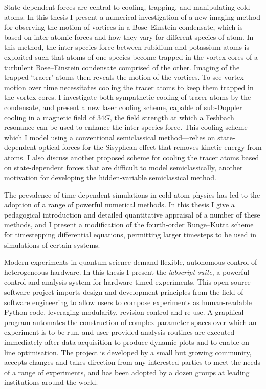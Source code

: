 State-dependent forces are central to cooling, trapping, and manipulating cold atoms. In this thesis I present a numerical investigation of a new imaging method for observing the motion of vortices in a Bose--Einstein condensate, which is based on inter-atomic forces and how they vary for different species of atom. In this method, the inter-species force between rubidium and potassium atoms is exploited such that atoms of one species become trapped in the vortex cores of a turbulent Bose--Einstein condensate comprised of the other. Imaging of the trapped `tracer' atoms then reveals the motion of the vortices. To see vortex motion over time necessitates cooling the tracer atoms to keep them trapped in the vortex cores. I investigate both sympathetic cooling of tracer atoms by the condensate, and present a new laser cooling scheme, capable of sub-Doppler cooling in a magnetic field of $34\unit{G}$, the field strength at which a Feshbach resonance can be used to enhance the inter-species force. This cooling scheme---which I model using a conventional semiclassical method---relies on state-dependent optical forces for the Sisyphean effect that removes kinetic energy from atoms. I also discuss another proposed scheme for cooling the tracer atoms based on state-dependent forces that are difficult to model semiclassically, another motivation for developing the hidden-variable semiclassical method.

The prevalence of time-dependent simulations in cold atom physics has led to the adoption of a range of powerful numerical methods. In this thesis I give a pedagogical introduction and detailed quantitative appraisal of a number of these methods, and I present a modification of the fourth-order Runge--Kutta scheme for timestepping differential equations, permitting larger timesteps to be used in simulations of certain systems.

Modern experiments in quantum science demand flexible, autonomous control of heterogeneous hardware. In this thesis I present the \emph{labscript suite}, a powerful control and analysis system for hardware-timed experiments. This open-source software project imports design and development principles from the field of software engineering to allow users to compose experiments as human-readable Python code, leveraging modularity, revision control and re-use. A graphical program automates the construction of complex parameter spaces over which an experiment is to be run, and user-provided analysis routines are executed immediately after data acquisition to produce dynamic plots and to enable on-line optimisation. The project is developed by a small but growing community, accepts changes and takes direction from any interested parties to meet the needs of a range of experiments, and has been adopted by a dozen groups at leading institutions around the world.


